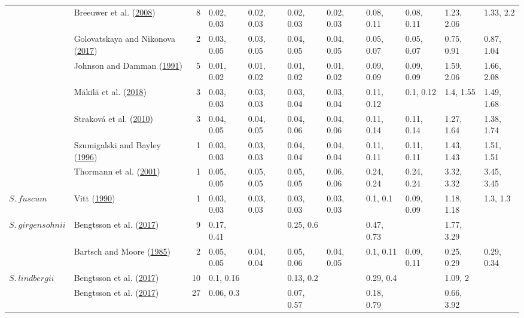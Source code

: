 \documentclass[
  12pt,
]{article}
\begin{document}
\begin{table}[H]
{\begin{tabular}[t]{llrllllllll}
 & Breeuwer et al. (\protect\hyperlink{ref-Breeuwer.2008}{2008}) & 8 & 0.02, 0.03 & 0.02, 0.03 & 0.02, 0.03 & 0.02, 0.03 & 0.08, 0.11 & 0.08, 0.11 & 1.23, 2.06 & 1.33, 2.2\\

 & Golovatskaya and Nikonova (\protect\hyperlink{ref-Golovatskaya.2017}{2017}) & 2 & 0.03, 0.05 & 0.03, 0.05 & 0.04, 0.05 & 0.04, 0.05 & 0.05, 0.07 & 0.05, 0.07 & 0.75, 0.91 & 0.87, 1.04\\

 & Johnson and Damman (\protect\hyperlink{ref-Johnson.1991}{1991}) & 5 & 0.01, 0.02 & 0.01, 0.02 & 0.01, 0.02 & 0.01, 0.02 & 0.09, 0.09 & 0.09, 0.09 & 1.59, 2.06 & 1.66, 2.08\\

 & Mäkilä et al. (\protect\hyperlink{ref-Makila.2018}{2018}) & 3 & 0.03, 0.03 & 0.03, 0.03 & 0.03, 0.04 & 0.03, 0.04 & 0.11, 0.12 & 0.1, 0.12 & 1.4, 1.55 & 1.49, 1.68\\

 & Straková et al. (\protect\hyperlink{ref-Strakova.2010}{2010}) & 3 & 0.04, 0.05 & 0.04, 0.05 & 0.04, 0.06 & 0.04, 0.06 & 0.11, 0.14 & 0.11, 0.14 & 1.27, 1.64 & 1.38, 1.74\\

 & Szumigalski and Bayley (\protect\hyperlink{ref-Szumigalski.1996}{1996}) & 1 & 0.03, 0.03 & 0.03, 0.03 & 0.04, 0.04 & 0.04, 0.04 & 0.11, 0.11 & 0.11, 0.11 & 1.43, 1.43 & 1.51, 1.51\\

 & Thormann et al. (\protect\hyperlink{ref-Thormann.2001}{2001}) & 1 & 0.05, 0.05 & 0.05, 0.05 & 0.05, 0.05 & 0.06, 0.06 & 0.24, 0.24 & 0.24, 0.24 & 3.32, 3.32 & 3.45, 3.45\\

\multirow[t]{-10}{*}{\raggedright\arraybackslash $S.~fuscum$} & Vitt (\protect\hyperlink{ref-Vitt.1990}{1990}) & 1 & 0.03, 0.03 & 0.03, 0.03 & 0.03, 0.03 & 0.03, 0.03 & 0.1, 0.1 & 0.09, 0.09 & 1.18, 1.18 & 1.3, 1.3\\
\cmidrule{1-11}
$S.~girgensohnii$ & Bengtsson et al. (\protect\hyperlink{ref-Bengtsson.2017}{2017}) & 9 & 0.17, 0.41 &  & 0.25, 0.6 &  & 0.47, 0.73 &  & 1.77, 3.29 & \\
\cmidrule{1-11}
 & Bartsch and Moore (\protect\hyperlink{ref-Bartsch.1985}{1985}) & 2 & 0.05, 0.05 & 0.04, 0.04 & 0.05, 0.06 & 0.04, 0.05 & 0.1, 0.11 & 0.09, 0.11 & 0.25, 0.29 & 0.29, 0.34\\

\multirow[t]{-2}{*}{\raggedright\arraybackslash $S.~lindbergii$} & Bengtsson et al. (\protect\hyperlink{ref-Bengtsson.2017}{2017}) & 10 & 0.1, 0.16 &  & 0.13, 0.2 &  & 0.29, 0.4 &  & 1.09, 2 & \\
\cmidrule{1-11}
 & Bengtsson et al. (\protect\hyperlink{ref-Bengtsson.2017}{2017}) & 27 & 0.06, 0.3 &  & 0.07, 0.57 &  & 0.18, 0.79 &  & 0.66, 3.92 & \\


\end{tabular}}
\end{table}
\end{document}
